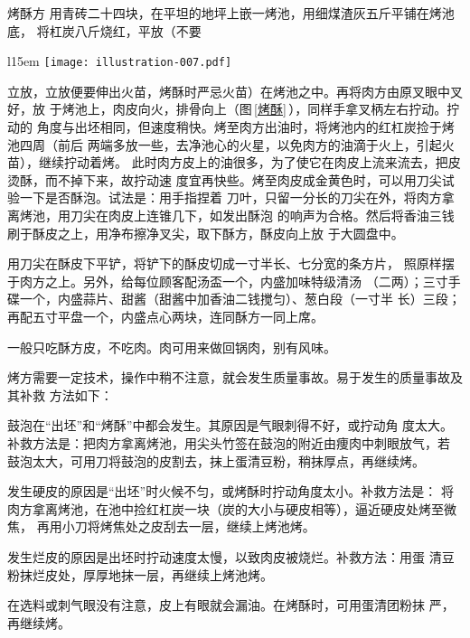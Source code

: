 \begin{recipe}{烤酥方}
\step[烤酥] 用青砖二十四块，在平坦的地坪上嵌一烤池，用细煤渣灰五斤平铺在烤池底，
将杠炭八斤烧红，平放（不要
\begin{wrapfigure}[13]{l}{15em}%
\centering%
\vspace{-.5\baselineskip}%
\texttt{[image: illustration-007.pdf]}%
\vspace{.1875\baselineskip}%
\caption{烤酥}
\label{烤酥}
\end{wrapfigure}
%
立放，立放便要伸出火苗，烤酥时严忌火苗）在烤池之中。再将肉方由原叉眼中叉好，放
于烤池上，肉皮向火，排骨向上（图\,\ref{烤酥}\,），同样手拿叉柄左右拧动。拧动的
角度与出坯相同，但速度稍快。烤至肉方出油时，将烤池内的红杠炭捡于烤池四周（前后
两端多放一些，去净池心的火星，以免肉方的油滴于火上，引起火苗），继续拧动着烤。
此时肉方皮上的油很多，为了使它在肉皮上流来流去，把皮烫酥，而不掉下来，故拧动速
度宜再快些。烤至肉皮成金黄色时，可以用刀尖试验一下是否酥泡。试法是：用手指捏着
刀叶，只留一分长的刀尖在外，将肉方拿离烤池，用刀尖在肉皮上连锥几下，如发出酥泡
的响声为合格。然后将香油三钱刷于酥皮之上，用净布擦净叉尖，取下酥方，酥皮向上放
于大圆盘中。

\step[铲皮上席] 用刀尖在酥皮下平铲，将铲下的酥皮切成一寸半长、七分宽的条方片，
照原样摆于肉方之上。另外，给每位顾客配汤盃一个，内盛加味特级清汤\footnotemark
（二两）；三寸手碟一个，内盛蒜片、甜酱（甜酱中加香油二钱搅匀）、葱白段（一寸半
长）三段；再配五寸平盘一个，内盛点心两块，连同酥方一同上席。

\step[吃法] 一般只吃酥方皮，不吃肉。肉可用来做回锅肉，别有风味。

\suggestion

烤方需要一定技术，操作中稍不注意，就会发生质量事故。易于发生的质量事故及其补救
方法如下：

\hint[方皮鼓泡] 鼓泡在“出坯”和“烤酥”中都会发生。其原因是气眼刺得不好，或拧动角
度太大。补救方法是：把肉方拿离烤池，用尖头竹签在鼓泡的附近由痩肉中刺眼放气，若
鼓泡太大，可用刀将鼓泡的皮割去，抹上蛋清豆粉，稍抹厚点，再继续烤。

\hint[硬皮] 发生硬皮的原因是“出坯”时火候不匀，或烤酥时拧动角度太小。补救方法是：
将肉方拿离烤池，在池中捡红杠炭一块（炭的大小与硬皮相等），逼近硬皮处烤至微焦，
再用小刀将烤焦处之皮刮去一层，继续上烤池烤。

\hint[烂皮] 发生烂皮的原因是出坯时拧动速度太慢，以致肉皮被烧烂。补救方法：用蛋
清豆粉抹烂皮处，厚厚地抹一层，再继续上烤池烤。

\hint[漏油] 在选料或刺气眼没有注意，皮上有眼就会漏油。在烤酥时，可用蛋清团粉抹
严，再继续烤。


\end{recipe}
